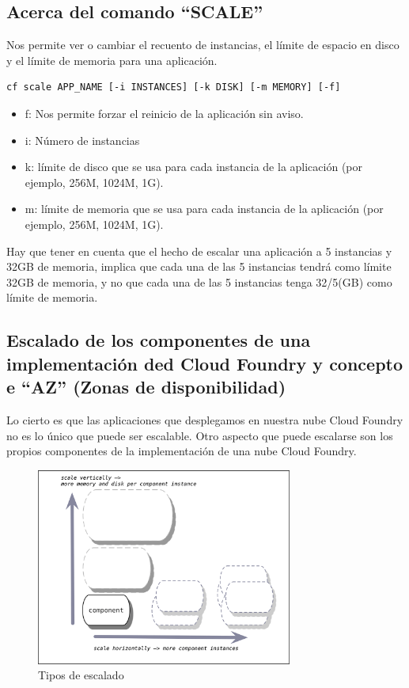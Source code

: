 \documentclass[a4paper,11pt]{article}
\begin{document}
\subsection{Acerca del comando ``SCALE''}
Nos permite ver o cambiar el recuento de instancias, el límite de espacio en disco y el límite de memoria para una aplicación.
\begin{verbatim}
cf scale APP_NAME [-i INSTANCES] [-k DISK] [-m MEMORY] [-f]
\end{verbatim}
\begin{itemize}
  \item f: Nos permite forzar el reinicio de la aplicación sin aviso.
    \item i: Número de instancias
    \item k: límite de disco que se usa para cada instancia de la aplicación (por ejemplo, 256M, 1024M, 1G).
    \item m: límite de memoria que se usa para cada instancia de la aplicación (por ejemplo, 256M, 1024M, 1G).
\end{itemize}
Hay que tener en cuenta que el hecho de escalar una aplicación a 5 instancias y 32GB de memoria, implica que cada una de las 5 instancias tendrá como límite 32GB de memoria, y no que cada una de las 5 instancias tenga 32/5(GB) como límite de memoria.

\subsection{Escalado de los componentes de una implementación ded Cloud Foundry y concepto e ``AZ'' (Zonas de disponibilidad)}
Lo cierto es que las aplicaciones que desplegamos en nuestra nube Cloud Foundry no es lo único que puede ser escalable.
Otro aspecto que puede escalarse son los propios componentes de la implementación de una nube Cloud Foundry.

\begin{figure}[h]
    \centering
    \includegraphics[width=0.75\textwidth]{fran1.png}
    \caption{Tipos de escalado}
    \label{fig:fran1}
\end{figure}
\end{document}
